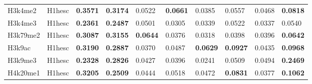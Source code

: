 \begin{table}[!ht]
\begin{tabular}{ll|ll|ll|ll|ll}
H3k4me2                              & H1hesc                                 & {\color[HTML]{CB0000} \textbf{0.3571}}                       & {\color[HTML]{CB0000} \textbf{0.3174}}                      & 0.0522                                & \textbf{0.0661}                      & 0.0385                                & 0.0557                                 & 0.0468                                & \textbf{0.0818}                        \\
H3k4me3                              & H1hesc                                 & {\color[HTML]{CB0000} \textbf{0.2361}}                       & {\color[HTML]{CB0000} \textbf{0.2487}}                      & 0.0501                                & 0.0305                               & 0.0339                                & 0.0522                                 & 0.0337                                & 0.0540                                 \\
H3k79me2                             & H1hesc                                 & {\color[HTML]{CB0000} \textbf{0.3087}}                       & {\color[HTML]{CB0000} \textbf{0.3155}}                      & \textbf{0.0644}                       & 0.0376                               & 0.0318                                & 0.0398                                 & 0.0396                                & \textbf{0.0642}                        \\
H3k9ac                               & H1hesc                                 & {\color[HTML]{CB0000} \textbf{0.3190}}                       & {\color[HTML]{CB0000} \textbf{0.2887}}                      & 0.0370                                & 0.0487                               & \textbf{0.0629}                       & \textbf{0.0927}                        & 0.0435                                & \textbf{0.0968}                        \\
H3k9me3                              & H1hesc                                 & {\color[HTML]{CB0000} \textbf{0.2328}}                       & {\color[HTML]{CB0000} \textbf{0.2826}}                      & 0.0427                                & 0.0396                               & 0.0241                                & 0.0509                                 & 0.0494                                & {\color[HTML]{CB0000} \textbf{0.2469}} \\
H4k20me1                             & H1hesc                                 & {\color[HTML]{CB0000} \textbf{0.3205}}                       & {\color[HTML]{CB0000} \textbf{0.2509}}                      & 0.0444                                & 0.0518                               & 0.0472                                & \textbf{0.0831}                        & 0.0377                                & {\color[HTML]{CB0000} \textbf{0.1062}} \\

\end{tabular}
\end{table}

